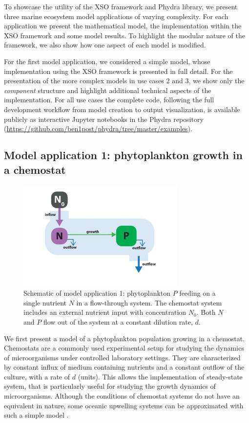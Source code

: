 \documentclass[journal abbreviation, manuscript]{copernicus}
\begin{document}
To showcase the utility of the XSO framework and Phydra library, we present three marine ecosystem model applications of varying complexity. For each application we present the mathematical model, the implementation within the XSO framework and some model results. To highlight the modular nature of the framework, we also show how one aspect of each model is modified.

For the first model application, we considered a simple model, whose implementation using the XSO framework is presented in full detail. For the presentation of the more complex models in use cases 2 and 3, we show only the \textit{component} structure and highlight additional technical aspects of the implementation. For all use cases the complete code, following the full development workflow from model creation to output visualization, is available publicly as interactive Jupyter notebooks in the Phydra repository (\url{https://github.com/ben1post/phydra/tree/master/examples}).

\subsection{Model application 1: phytoplankton growth in a chemostat}
\begin{figure}[t]
\includegraphics[width=8.3cm]{Figures/firstdraft_schematics/01_schematics_Chemostat.pdf}
\caption{Schematic of model application 1: phytoplankton $P$ feeding on a single nutrient $N$ in a flow-through system. The chemostat system includes an external nutrient input with concentration $N_0$. Both $N$ and $P$ flow out of the system at a constant dilution rate, $d$.}
\label{Figure:ModelSchematics_1}
\end{figure}

We first present a model of a phytoplankton population growing in a chemostat. Chemostats are a commonly used experimental setup for studying the dynamics of microorganisms under controlled laboratory settings. They are characterized by constant influx of medium containing nutrients and a constant outflow of the culture, with a rate of $d$ (units). This allows the implementation of steady-state system, that is particularly useful for studying the growth dynamics of microorganisms. Although the conditions of chemostat systems do not have an equivalent in nature, some oceanic upwelling systems can be approximated with such a simple model \citep{Haefner2005ModelingApplications}.
\end{document}
